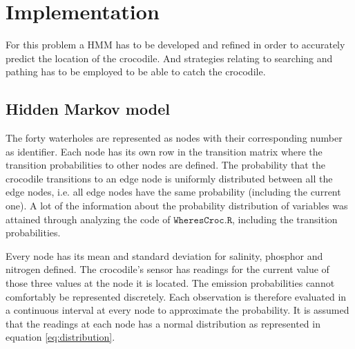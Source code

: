 \documentclass[12pt, a4paper]{article}
\begin{document}

\section{Implementation}\label{sec:implementation}

For this problem a HMM has to be developed and refined in order to accurately predict the location of the crocodile. And strategies relating to searching and pathing has to be employed to be able to catch the crocodile. 

\subsection{Hidden Markov model}

The forty waterholes are represented as nodes with their corresponding number as identifier. Each node has its own row in the transition matrix where the transition probabilities to other nodes are defined. The probability that the crocodile transitions to an edge node is uniformly distributed between all the edge nodes, i.e. all edge nodes have the same probability (including the current one). A lot of the information about the probability distribution of variables was attained through analyzing the code of $ \mathtt{WheresCroc.R}$, including the transition probabilities.

Every node has its mean and standard deviation for salinity, phosphor and nitrogen defined. The crocodile's sensor has readings for the current value of those three values at the node it is located. The emission probabilities cannot comfortably be represented discretely. Each observation is therefore evaluated in a continuous interval at every node to approximate the probability. It is assumed that the readings at each node has a normal distribution as represented in equation \ref{eq:distribution}.
\end{document}

